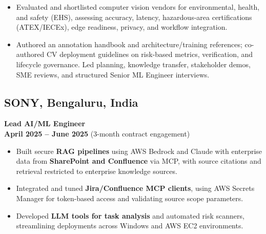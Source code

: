 \documentclass[a4paper,10pt]{article}
\begin{document}
\begin{itemize}
\item Evaluated and shortlisted computer vision vendors for environmental, health, and safety (EHS), assessing accuracy, latency, hazardous-area certifications (ATEX/IECEx), edge readiness, privacy, and workflow integration.

\item Authored an annotation handbook and architecture/training references; co-authored CV deployment guidelines on risk-based metrics, verification, and lifecycle governance. Led planning, knowledge transfer, stakeholder demos, SME reviews, and structured Senior ML Engineer interviews.
\end{itemize}	
	
	
\subsection{SONY, Bengaluru, India}
\textbf{Lead AI/ML Engineer} \\
\hfill \textbf{April 2025 -- June 2025} (3-month contract engagement)
\begin{itemize}
	\item Built secure \textbf{RAG pipelines} using AWS Bedrock and Claude with enterprise data from \textbf{SharePoint and Confluence} via MCP, with source citations and retrieval restricted to enterprise knowledge sources.
	\item Integrated and tuned \textbf{Jira/Confluence MCP clients}, using AWS Secrets Manager for token-based access and validating source scope parameters.
	\item Developed \textbf{LLM tools for task analysis} and automated risk scanners, streamlining deployments across Windows and AWS EC2 environments.
\end{itemize}	
	
	
\end{document}
